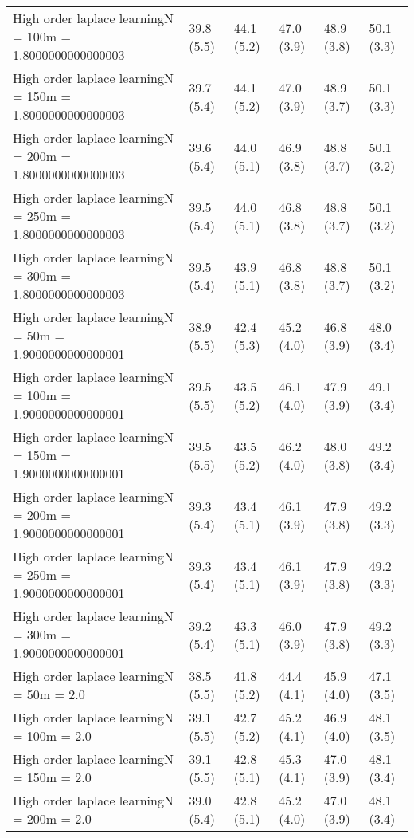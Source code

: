 \documentclass{article}
\begin{document}
\begin{table*}[t!]
\begin{center}
\begin{small}
\begin{sc}
\begin{tabular}{llllll}
High order laplace learningN = 100m = 1.8000000000000003&39.8 (5.5)      &44.1 (5.2)      &47.0 (3.9)      &48.9 (3.8)      &50.1 (3.3)      \\
High order laplace learningN = 150m = 1.8000000000000003&39.7 (5.4)      &44.1 (5.2)      &47.0 (3.9)      &48.9 (3.7)      &50.1 (3.3)      \\
High order laplace learningN = 200m = 1.8000000000000003&39.6 (5.4)      &44.0 (5.1)      &46.9 (3.8)      &48.8 (3.7)      &50.1 (3.2)      \\
High order laplace learningN = 250m = 1.8000000000000003&39.5 (5.4)      &44.0 (5.1)      &46.8 (3.8)      &48.8 (3.7)      &50.1 (3.2)      \\
High order laplace learningN = 300m = 1.8000000000000003&39.5 (5.4)      &43.9 (5.1)      &46.8 (3.8)      &48.8 (3.7)      &50.1 (3.2)      \\
High order laplace learningN = 50m = 1.9000000000000001&38.9 (5.5)      &42.4 (5.3)      &45.2 (4.0)      &46.8 (3.9)      &48.0 (3.4)      \\
High order laplace learningN = 100m = 1.9000000000000001&39.5 (5.5)      &43.5 (5.2)      &46.1 (4.0)      &47.9 (3.9)      &49.1 (3.4)      \\
High order laplace learningN = 150m = 1.9000000000000001&39.5 (5.5)      &43.5 (5.2)      &46.2 (4.0)      &48.0 (3.8)      &49.2 (3.4)      \\
High order laplace learningN = 200m = 1.9000000000000001&39.3 (5.4)      &43.4 (5.1)      &46.1 (3.9)      &47.9 (3.8)      &49.2 (3.3)      \\
High order laplace learningN = 250m = 1.9000000000000001&39.3 (5.4)      &43.4 (5.1)      &46.1 (3.9)      &47.9 (3.8)      &49.2 (3.3)      \\
High order laplace learningN = 300m = 1.9000000000000001&39.2 (5.4)      &43.3 (5.1)      &46.0 (3.9)      &47.9 (3.8)      &49.2 (3.3)      \\
High order laplace learningN = 50m = 2.0&38.5 (5.5)      &41.8 (5.2)      &44.4 (4.1)      &45.9 (4.0)      &47.1 (3.5)      \\
High order laplace learningN = 100m = 2.0&39.1 (5.5)      &42.7 (5.2)      &45.2 (4.1)      &46.9 (4.0)      &48.1 (3.5)      \\
High order laplace learningN = 150m = 2.0&39.1 (5.5)      &42.8 (5.1)      &45.3 (4.1)      &47.0 (3.9)      &48.1 (3.4)      \\
High order laplace learningN = 200m = 2.0&39.0 (5.4)      &42.8 (5.1)      &45.2 (4.0)      &47.0 (3.9)      &48.1 (3.4)      \\

\end{tabular}
\end{sc}
\end{small}
\end{center}
\end{table*}
\end{document}
